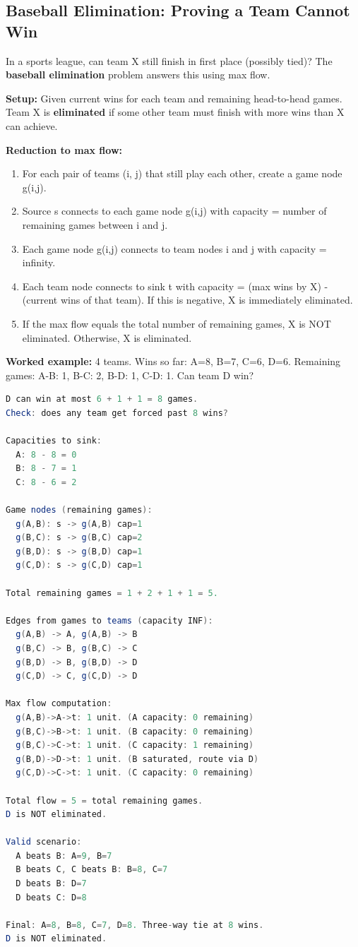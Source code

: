 \subsection{Baseball Elimination: Proving a Team Cannot Win}

In a sports league, can team X still finish in first place (possibly tied)? The \textbf{baseball elimination} problem answers this using max flow.

\textbf{Setup:} Given current wins for each team and remaining head-to-head games. Team X is \textbf{eliminated} if some other team must finish with more wins than X can achieve.

\textbf{Reduction to max flow:}
\begin{enumerate}
\item For each pair of teams (i, j) that still play each other, create a game node g(i,j).
\item Source s connects to each game node g(i,j) with capacity = number of remaining games between i and j.
\item Each game node g(i,j) connects to team nodes i and j with capacity = infinity.
\item Each team node connects to sink t with capacity = (max wins by X) - (current wins of that team). If this is negative, X is immediately eliminated.
\item If the max flow equals the total number of remaining games, X is NOT eliminated. Otherwise, X is eliminated.
\end{enumerate}

\textbf{Worked example:} 4 teams. Wins so far: A=8, B=7, C=6, D=6. Remaining games: A-B: 1, B-C: 2, B-D: 1, C-D: 1. Can team D win?

\begin{lstlisting}[language=Java]
D can win at most 6 + 1 + 1 = 8 games.
Check: does any team get forced past 8 wins?

Capacities to sink:
  A: 8 - 8 = 0
  B: 8 - 7 = 1
  C: 8 - 6 = 2

Game nodes (remaining games):
  g(A,B): s -> g(A,B) cap=1
  g(B,C): s -> g(B,C) cap=2
  g(B,D): s -> g(B,D) cap=1
  g(C,D): s -> g(C,D) cap=1

Total remaining games = 1 + 2 + 1 + 1 = 5.

Edges from games to teams (capacity INF):
  g(A,B) -> A, g(A,B) -> B
  g(B,C) -> B, g(B,C) -> C
  g(B,D) -> B, g(B,D) -> D
  g(C,D) -> C, g(C,D) -> D

Max flow computation:
  g(A,B)->A->t: 1 unit. (A capacity: 0 remaining)
  g(B,C)->B->t: 1 unit. (B capacity: 0 remaining)
  g(B,C)->C->t: 1 unit. (C capacity: 1 remaining)
  g(B,D)->D->t: 1 unit. (B saturated, route via D)
  g(C,D)->C->t: 1 unit. (C capacity: 0 remaining)

Total flow = 5 = total remaining games.
D is NOT eliminated.

Valid scenario:
  A beats B: A=9, B=7
  B beats C, C beats B: B=8, C=7
  D beats B: D=7
  D beats C: D=8

Final: A=8, B=8, C=7, D=8. Three-way tie at 8 wins.
D is NOT eliminated.
\end{lstlisting}

